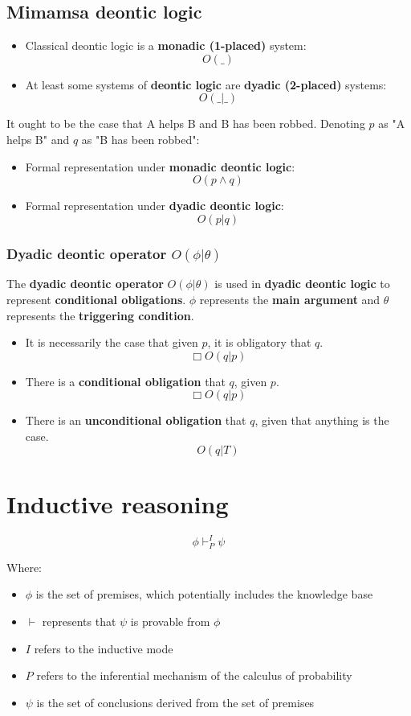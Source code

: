 \documentclass[11pt]{article}
\begin{document}
\subsection{Mimamsa deontic logic}
\label{sec:org0db4b94}
\begin{itemize}
\item Classical deontic logic is a \textbf{monadic (1-placed)} system:
\[O(\_)\]
\item At least some systems of \textbf{deontic logic} are \textbf{dyadic (2-placed)} systems:
\[O(\_ | \_)\]
\end{itemize}

It ought to be the case that A helps B and B has been robbed. Denoting \(p\) as "A helps B" and \(q\) as "B has been robbed":
\begin{itemize}
\item Formal representation under \textbf{monadic deontic logic}:
\[O(p \wedge q)\]
\item Formal representation under \textbf{dyadic deontic logic}:
\[O(p | q)\]
\end{itemize}
\subsubsection{Dyadic deontic operator \(O(\phi | \theta)\)}
\label{sec:org0f9980b}
The \textbf{dyadic deontic operator} \(O(\phi | \theta)\) is used in \textbf{dyadic deontic logic} to represent \textbf{conditional obligations}. \(\phi\) represents the \textbf{main argument} and \(\theta\) represents the \textbf{triggering condition}.

\begin{itemize}
\item It is necessarily the case that given \(p\), it is obligatory that \(q\).
\[\Box O (q | p)\]
\item There is a \textbf{conditional obligation} that \(q\), given \(p\).
\[\Box O (q | p)\]
\item There is an \textbf{unconditional obligation} that \(q\), given that anything is the case.
\[O (q | T)\]
\end{itemize}
\section{Inductive reasoning}
\label{sec:org74a495c}
\[\phi \vdash^{I}_{P} \psi\]

Where:
\begin{itemize}
\item \(\phi\) is the set of premises, which potentially includes the knowledge base
\item \(\vdash\) represents that \(\psi\) is provable from \(\phi\)
\item \(I\) refers to the inductive mode
\item \(P\) refers to the inferential mechanism of the calculus of probability
\item \(\psi\) is the set of conclusions derived from the set of premises
\end{itemize}
\end{document}
